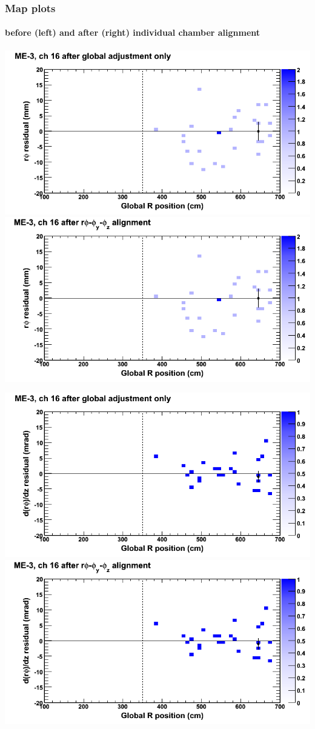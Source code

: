 \documentclass[compress]{beamer}
\begin{document}
\begin{frame}
\frametitle{Map plots}
\framesubtitle{before (left) and after (right) individual chamber alignment}
\includegraphics[width=0.5\linewidth]{ringmapplots_3dof/before_CSCvsr_mem3ch16_x.png} \includegraphics[width=0.5\linewidth]{ringmapplots_3dof/after_CSCvsr_mem3ch16_x.png}

\includegraphics[width=0.5\linewidth]{ringmapplots_3dof/before_CSCvsr_mem3ch16_dxdz.png} \includegraphics[width=0.5\linewidth]{ringmapplots_3dof/after_CSCvsr_mem3ch16_dxdz.png}
\end{frame}
\end{document}
